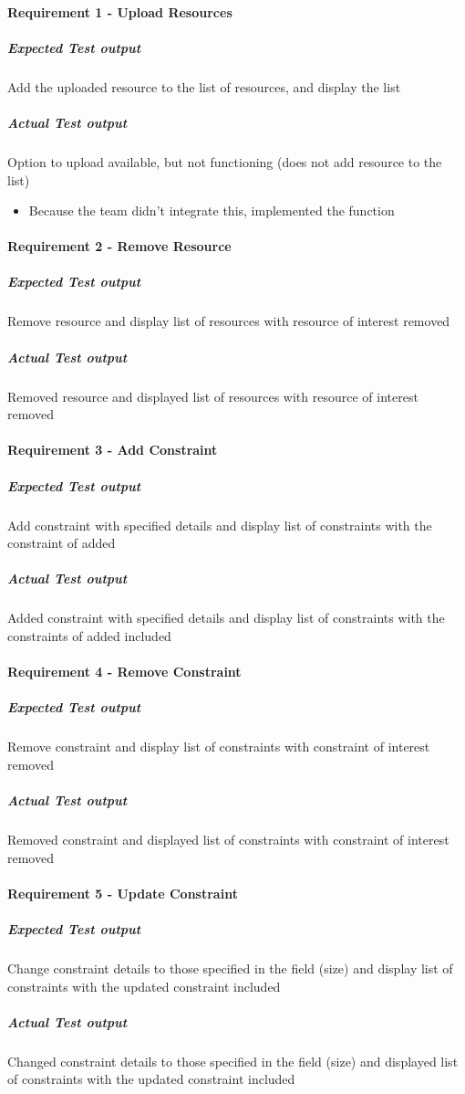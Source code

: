 
\paragraph{Requirement 1 - Upload Resources}
	\subparagraph{Expected Test output}
	Add the uploaded resource to the list of resources, and display the list
	
	\subparagraph{Actual Test output}
	Option to upload available, but not functioning (does not add resource to the list) 
		\begin{itemize}
			\item Because the team didn't integrate this, implemented the function
		\end{itemize}
		
\paragraph{Requirement 2 - Remove Resource}
	\subparagraph{Expected Test output}
	Remove resource and display list of resources with resource of interest removed
	
	\subparagraph{Actual Test output}
	Removed resource and displayed list of resources with resource of interest removed
	
\paragraph{Requirement 3 - Add Constraint}
	\subparagraph{Expected Test output}
	Add constraint with specified details and display list of constraints with the constraint of added 
	
	\subparagraph{Actual Test output}
	Added constraint with specified details and display list of constraints with the constraints of added included
	
\paragraph{Requirement 4 - Remove Constraint}
	\subparagraph{Expected Test output}
	Remove constraint and display list of constraints with constraint of interest removed
	
	\subparagraph{Actual Test output}
	Removed constraint and displayed list of constraints with constraint of interest removed
	
\paragraph{Requirement 5 - Update Constraint}
	\subparagraph{Expected Test output}
	Change constraint details to those specified in the field (size) and display list of constraints with the updated constraint included
	
	\subparagraph{Actual Test output}
	Changed constraint details to those specified in the field (size) and displayed list of constraints with the updated constraint included